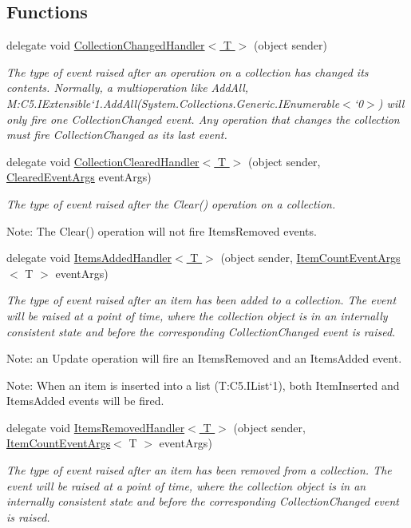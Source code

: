 \subsection*{Functions}
\begin{DoxyCompactItemize}
\item 
delegate void \hyperlink{namespace_c5_a1e765c361aac015d7c57a8d3c6cb57c8}{Collection\+Changed\+Handler$<$ T $>$} (object sender)
\begin{DoxyCompactList}\small\item\em The type of event raised after an operation on a collection has changed its contents. Normally, a multioperation like Add\+All, M\+:\+C5.\+I\+Extensible`1.\+Add\+All(\+System.\+Collections.\+Generic.\+I\+Enumerable$<$`0$>$) will only fire one Collection\+Changed event. Any operation that changes the collection must fire Collection\+Changed as its last event. \end{DoxyCompactList}\item 
delegate void \hyperlink{namespace_c5_a8b919520e05c2cecbf5306cbcdce3590}{Collection\+Cleared\+Handler$<$ T $>$} (object sender, \hyperlink{class_c5_1_1_cleared_event_args}{Cleared\+Event\+Args} event\+Args)
\begin{DoxyCompactList}\small\item\em The type of event raised after the Clear() operation on a collection. 

Note\+: The Clear() operation will not fire Items\+Removed events. \end{DoxyCompactList}\item 
delegate void \hyperlink{namespace_c5_a425bfbd2929db06c66d15c3cbd186b85}{Items\+Added\+Handler$<$ T $>$} (object sender, \hyperlink{class_c5_1_1_item_count_event_args}{Item\+Count\+Event\+Args}$<$ T $>$ event\+Args)
\begin{DoxyCompactList}\small\item\em The type of event raised after an item has been added to a collection. The event will be raised at a point of time, where the collection object is in an internally consistent state and before the corresponding Collection\+Changed event is raised. 

Note\+: an Update operation will fire an Items\+Removed and an Items\+Added event. 

Note\+: When an item is inserted into a list (T\+:\+C5.\+I\+List`1), both Item\+Inserted and Items\+Added events will be fired. \end{DoxyCompactList}\item 
delegate void \hyperlink{namespace_c5_a4bca5e39597898aa21a60ecf3de8f97f}{Items\+Removed\+Handler$<$ T $>$} (object sender, \hyperlink{class_c5_1_1_item_count_event_args}{Item\+Count\+Event\+Args}$<$ T $>$ event\+Args)
\begin{DoxyCompactList}\small\item\em The type of event raised after an item has been removed from a collection. The event will be raised at a point of time, where the collection object is in an internally consistent state and before the corresponding Collection\+Changed event is raised. 


\end{DoxyCompactList}
\end{DoxyCompactItemize}

